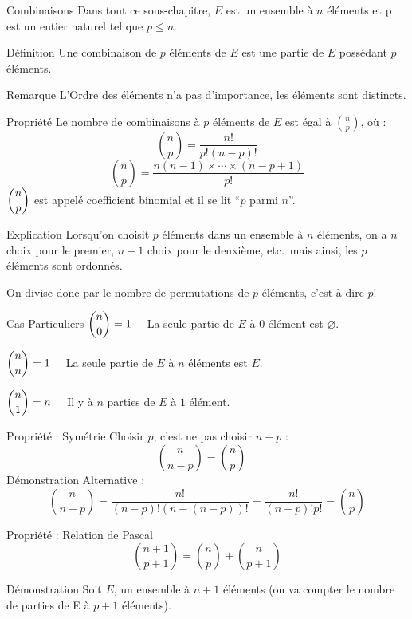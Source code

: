 \documentclass{cours}
\begin{document}
    \pagebreak[3]
    \begin{Gpartie}{Combinaisons}
        Dans tout ce sous-chapitre, $E$ est un ensemble à $n$ éléments et p est un entier naturel tel que $p\leq n$.
        \begin{Spartie}{Définition}
            Une combinaison de $p$ éléments de $E$ est une partie de $E$ possédant $p$ éléments.
            \begin{SSpartie}{Remarque}
                L'Ordre des éléments n'a pas d'importance, les éléments sont distincts.
            \end{SSpartie}
        \end{Spartie}
        \begin{Spartie}{Propriété}
            Le nombre de combinaisons à $p$ éléments de $E$ est égal à $\binom{n}{p}$, où :
            \[\binom{n}{p}=\dfrac{n!}{p!(n-p)!}\]
            \[\binom{n}{p}=\dfrac{n(n-1)\times\dotsb\times(n-p+1)}{p!}\]
            $\dbinom{n}{p}$ est appelé coefficient binomial et il se lit ``$p$ parmi $n$''.
            \begin{SSpartie}{Explication}
                Lorsqu'on choisit $p$ éléments dans un ensemble à $n$ éléments, on a $n$ choix pour le premier, $n-1$ choix pour le deuxième, etc.\ mais ainsi, les $p$ éléments sont ordonnés.

                On divise donc par le nombre de permutations de $p$ éléments, c'est-à-dire $p!$
            \end{SSpartie}
            \begin{SSpartie}{Cas Particuliers}
                $\dbinom{n}{0}=1\quad$ La seule partie de $E$ à $0$ élément est $\varnothing$.

                $\dbinom{n}{n}=1\quad$ La seule partie de $E$ à $n$ éléments est $E$.

                $\dbinom{n}{1}=n\quad$ Il y à $n$ parties de $E$ à $1$ élément.
            \end{SSpartie}
        \end{Spartie}
        \begin{Spartie}{Propriété : Symétrie}
            Choisir $p$, c'est ne pas choisir $n-p$ :
            \[\binom{n}{n-p}=\binom{n}{p}\quad\]
            Démonstration Alternative : 
            \[\binom{n}{n-p}=\dfrac{n!}{(n-p)!(n-(n-p))!}=\dfrac{n!}{(n-p)!p!}=\binom{n}{p}\]
        \end{Spartie}
        \begin{Spartie}{Propriété : Relation de Pascal}
            \[\binom{n+1}{p+1}=\binom{n}{p}+\binom{n}{p+1}\]
            \begin{SSpartie}{Démonstration}
                Soit $E$, un ensemble à $n+1$ éléments (on va compter le nombre de parties de E à $p+1$ éléments).


\end{SSpartie}
\end{Spartie}
\end{Gpartie}
\end{document}
